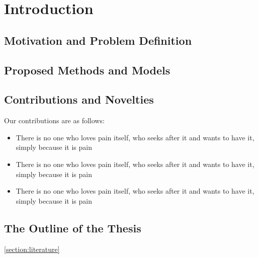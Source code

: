 \chapter{Introduction}
\label{chapter:introduction}

\section{Motivation and Problem Definition}
\label{section:motivation}
    \lipsum
\section{Proposed Methods and Models}
    \lipsum
\section{Contributions and Novelties}
\label{section:contributions}

Our contributions are as follows:

\begin{itemize}
\item There is no one who loves pain itself, who seeks after it and wants to have it, simply because it is pain
\item There is no one who loves pain itself, who seeks after it and wants to have it, simply because it is pain
\item There is no one who loves pain itself, who seeks after it and wants to have it, simply because it is pain
\end{itemize}

\section{The Outline of the Thesis}
\label{section:outline}
    \lipsum
\cref{section:literature}